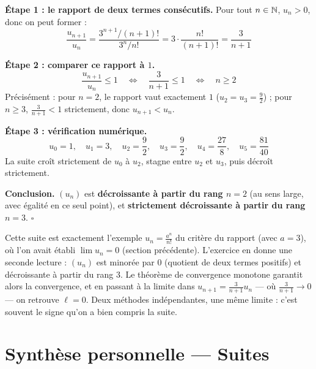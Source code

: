\begin{proofbox}[Solution]
\textbf{Étape 1 : le rapport de deux termes consécutifs.} Pour tout $n \in \mathbb{N}$, $u_n > 0$, donc on peut former :
\[
  \frac{u_{n+1}}{u_n} = \frac{3^{n+1}/(n+1)!}{3^n/n!} = 3 \cdot \frac{n!}{(n+1)!} = \frac{3}{n+1}
\]

\textbf{Étape 2 : comparer ce rapport à $1$.}
\[
  \frac{u_{n+1}}{u_n} \leqslant 1 \quad\Longleftrightarrow\quad \frac{3}{n+1} \leqslant 1 \quad\Longleftrightarrow\quad n \geqslant 2
\]
Précisément : pour $n = 2$, le rapport vaut exactement $1$ ($u_2 = u_3 = \frac{9}{2}$) ; pour $n \geqslant 3$, $\frac{3}{n+1} < 1$ strictement, donc $u_{n+1} < u_n$.

\textbf{Étape 3 : vérification numérique.}
\[
  u_0 = 1, \quad u_1 = 3, \quad u_2 = \frac{9}{2}, \quad u_3 = \frac{9}{2}, \quad u_4 = \frac{27}{8}, \quad u_5 = \frac{81}{40}
\]
La suite croît strictement de $u_0$ à $u_2$, stagne entre $u_2$ et $u_3$, puis décroît strictement.

\textbf{Conclusion.} $(u_n)$ est \textbf{décroissante à partir du rang $n = 2$} (au sens large, avec égalité en ce seul point), et \textbf{strictement décroissante à partir du rang $n = 3$}. \hfill$\square$
\end{proofbox}

\begin{intuitionbox}
Cette suite est exactement l'exemple $u_n = \frac{a^n}{n!}$ du critère du rapport (avec $a = 3$), où l'on avait établi $\lim u_n = 0$ (section précédente). L'exercice en donne une seconde lecture : $(u_n)$ est minorée par $0$ (quotient de deux termes positifs) et décroissante à partir du rang $3$. Le théorème de convergence monotone garantit alors la convergence, et en passant à la limite dans $u_{n+1} = \frac{3}{n+1} u_n$ --- où $\frac{3}{n+1} \to 0$ --- on retrouve $\ell = 0$. Deux méthodes indépendantes, une même limite : c'est souvent le signe qu'on a bien compris la suite.
\end{intuitionbox}


\section{Synthèse personnelle --- Suites}

